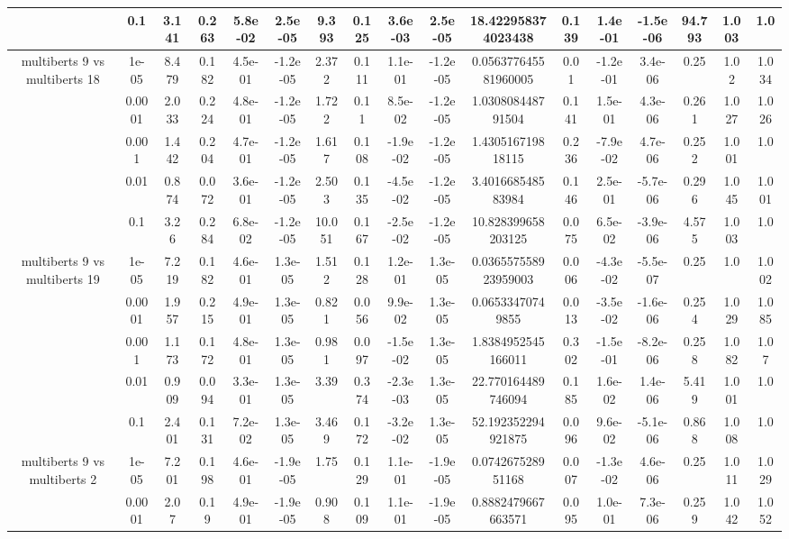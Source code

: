 \begin{tabular}{|c|c|c|c|c|c|c|c|c|c|c|c|c|c|c|c|c|}
 & 0.1 & 3.141 & 0.263 & 5.8e-02 & 2.5e-05 & 9.393 & 0.125 & 3.6e-03 & 2.5e-05 & 18.422958374023438 & 0.139 & 1.4e-01 & -1.5e-06 & 94.793 & 1.003 & 1.0 \\
\hline
\multirow{5}{*}{multiberts 9 vs multiberts 18} & 1e-05 & 8.479 & 0.182 & 4.5e-01 & -1.2e-05 & 2.372 & 0.111 & 1.1e-01 & -1.2e-05 & 0.056377645581960005 & 0.01 & -1.2e-01 & 3.4e-06 & 0.25 & 1.02 & 1.034 \\
 & 0.0001 & 2.033 & 0.224 & 4.8e-01 & -1.2e-05 & 1.722 & 0.11 & 8.5e-02 & -1.2e-05 & 1.030808448791504 & 0.141 & 1.5e-01 & 4.3e-06 & 0.261 & 1.027 & 1.026 \\
 & 0.001 & 1.442 & 0.204 & 4.7e-01 & -1.2e-05 & 1.617 & 0.108 & -1.9e-02 & -1.2e-05 & 1.430516719818115 & 0.236 & -7.9e-02 & 4.7e-06 & 0.252 & 1.001 & 1.0 \\
 & 0.01 & 0.874 & 0.072 & 3.6e-01 & -1.2e-05 & 2.503 & 0.135 & -4.5e-02 & -1.2e-05 & 3.401668548583984 & 0.146 & 2.5e-01 & -5.7e-06 & 0.296 & 1.045 & 1.001 \\
 & 0.1 & 3.26 & 0.284 & 6.8e-02 & -1.2e-05 & 10.051 & 0.167 & -2.5e-02 & -1.2e-05 & 10.828399658203125 & 0.075 & 6.5e-02 & -3.9e-06 & 4.575 & 1.003 & 1.0 \\
\hline
\multirow{5}{*}{multiberts 9 vs multiberts 19} & 1e-05 & 7.219 & 0.182 & 4.6e-01 & 1.3e-05 & 1.512 & 0.128 & 1.2e-01 & 1.3e-05 & 0.036557558923959003 & 0.006 & -4.3e-02 & -5.5e-07 & 0.25 & 1.0 & 1.002 \\
 & 0.0001 & 1.957 & 0.215 & 4.9e-01 & 1.3e-05 & 0.821 & 0.056 & 9.9e-02 & 1.3e-05 & 0.06533470749855 & 0.013 & -3.5e-02 & -1.6e-06 & 0.254 & 1.029 & 1.085 \\
 & 0.001 & 1.173 & 0.172 & 4.8e-01 & 1.3e-05 & 0.981 & 0.097 & -1.5e-02 & 1.3e-05 & 1.8384952545166011 & 0.302 & -1.5e-01 & -8.2e-06 & 0.258 & 1.082 & 1.07 \\
 & 0.01 & 0.909 & 0.094 & 3.3e-01 & 1.3e-05 & 3.39 & 0.374 & -2.3e-03 & 1.3e-05 & 22.770164489746094 & 0.185 & 1.6e-02 & 1.4e-06 & 5.419 & 1.001 & 1.0 \\
 & 0.1 & 2.401 & 0.131 & 7.2e-02 & 1.3e-05 & 3.469 & 0.172 & -3.2e-02 & 1.3e-05 & 52.192352294921875 & 0.096 & 9.6e-02 & -5.1e-06 & 0.868 & 1.008 & 1.0 \\
\hline
\multirow{5}{*}{multiberts 9 vs multiberts 2} & 1e-05 & 7.201 & 0.198 & 4.6e-01 & -1.9e-05 & 1.75 & 0.129 & 1.1e-01 & -1.9e-05 & 0.074267528951168 & 0.007 & -1.3e-02 & 4.6e-06 & 0.25 & 1.011 & 1.029 \\
 & 0.0001 & 2.07 & 0.19 & 4.9e-01 & -1.9e-05 & 0.908 & 0.109 & 1.1e-01 & -1.9e-05 & 0.8882479667663571 & 0.095 & 1.0e-01 & 7.3e-06 & 0.259 & 1.042 & 1.052 \\

\end{tabular}
